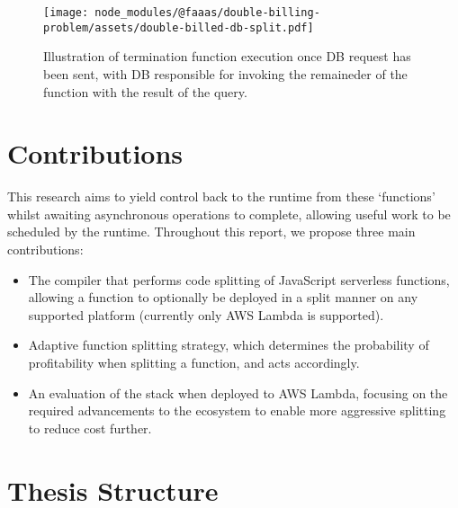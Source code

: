 \begin{figure}[t]
    \texttt{[image: node\_modules/@faaas/double-billing-problem/assets/double-billed-db-split.pdf]}
    \caption{Illustration of termination function execution once DB request has been sent, with DB responsible for invoking the remaineder of the function with the result of the query.}
    \label{fig:double-billing-db-split}
\end{figure}

\section{Contributions}

This research aims to yield control back to the runtime from these `functions' whilst awaiting asynchronous operations to complete, allowing useful work to be scheduled by the runtime. Throughout this report, we propose three main contributions:

\begin{itemize}
    \item The \faaasc{} compiler that performs code splitting of JavaScript serverless functions, allowing a function to optionally be deployed in a split manner on any supported \faas{} platform (currently only AWS Lambda is supported).

    \item Adaptive function splitting strategy, which determines the probability of profitability when splitting a function, and acts accordingly.

    \item An evaluation of the \faaas{} stack when deployed to AWS Lambda, focusing on the required advancements to the \faas{} ecosystem to enable more aggressive splitting to reduce cost further.
\end{itemize}

\section{Thesis Structure}
